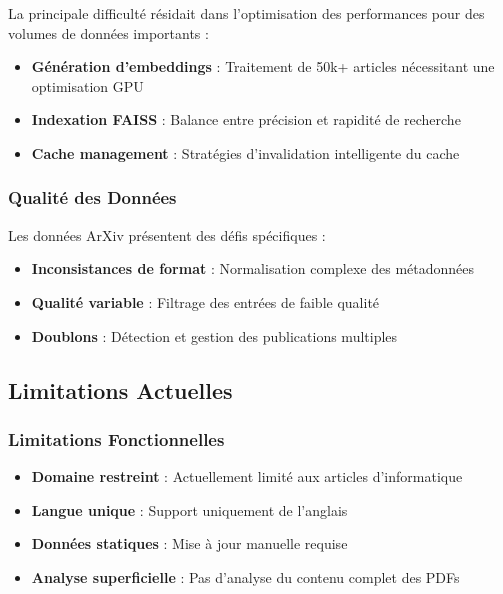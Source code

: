 \documentclass[12pt,a4paper]{article}
\begin{document}
La principale difficulté résidait dans l'optimisation des performances pour des volumes de données importants :

\begin{itemize}
    \item \textbf{Génération d'embeddings} : Traitement de 50k+ articles nécessitant une optimisation GPU
    \item \textbf{Indexation FAISS} : Balance entre précision et rapidité de recherche
    \item \textbf{Cache management} : Stratégies d'invalidation intelligente du cache
\end{itemize}

\subsubsection{Qualité des Données}

Les données ArXiv présentent des défis spécifiques :

\begin{itemize}
    \item \textbf{Inconsistances de format} : Normalisation complexe des métadonnées
    \item \textbf{Qualité variable} : Filtrage des entrées de faible qualité
    \item \textbf{Doublons} : Détection et gestion des publications multiples
\end{itemize}

\subsection{Limitations Actuelles}

\subsubsection{Limitations Fonctionnelles}

\begin{itemize}
    \item \textbf{Domaine restreint} : Actuellement limité aux articles d'informatique
    \item \textbf{Langue unique} : Support uniquement de l'anglais
    \item \textbf{Données statiques} : Mise à jour manuelle requise
    \item \textbf{Analyse superficielle} : Pas d'analyse du contenu complet des PDFs
\end{itemize}
\end{document}
